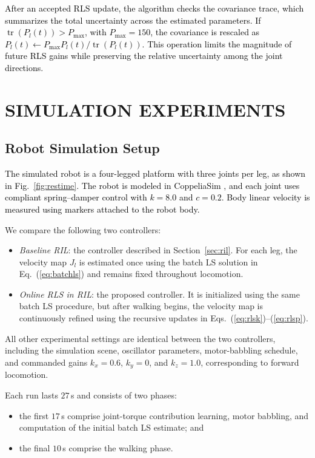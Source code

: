 \documentclass[a4paper, 10pt, conference]{ieeeconf}
\newcommand{\Jm}{J}
\newcommand{\newtext}[1]{\textcolor{black}{#1}}
\begin{document}
\newtext{After an accepted RLS update, the
algorithm checks the covariance trace, which summarizes the total uncertainty
across the estimated parameters. If
$\operatorname{tr}\!\left(P_l(t)\right)>P_{\max}$, with $P_{\max}=150$, the
covariance is rescaled as
$P_l(t)\leftarrow P_{\max}P_l(t)/\operatorname{tr}\!\left(P_l(t)\right)$.
This operation limits the magnitude of future RLS gains while preserving the
relative uncertainty among the joint directions.}

\section{SIMULATION EXPERIMENTS}
\label{sec:sim}

\subsection{Robot Simulation Setup}

\newtext{The simulated robot is a four-legged platform with three joints per
leg, as shown in Fig.~\ref{fig:restime}. The robot is modeled in CoppeliaSim
\cite{rohmer2013}, and each joint uses compliant spring--damper control with
$k=8.0$ and $c=0.2$. Body linear velocity is measured using markers attached to
the robot body.}

We compare the following two controllers:

\begin{itemize}
    \item \emph{Baseline RIL}: the controller described in Section~\ref{sec:ril}. For each leg, the velocity map $\Jm_l$ is estimated once using the batch LS solution in Eq.~(\ref{eq:batchls}) and remains fixed throughout locomotion.
    \item \emph{Online RLS in RIL}: the proposed controller. It is initialized using the same batch LS procedure, but after walking begins, the velocity map is continuously refined using the recursive updates in Eqs.~(\ref{eq:rlsk})--(\ref{eq:rlsp}).
\end{itemize}

All other experimental settings are identical between the two controllers, including the simulation scene, oscillator parameters, motor-babbling schedule, and commanded gains $k_x=0.6$, $k_y=0$, and $k_z=1.0$, corresponding to forward locomotion.

Each run lasts $27$\,s and consists of two phases:
\begin{itemize}
    \item the first $17$\,s comprise joint-torque contribution learning, motor babbling, and computation of the initial batch LS estimate; and
    \item the final $10$\,s comprise the walking phase.
\end{itemize}
\end{document}
